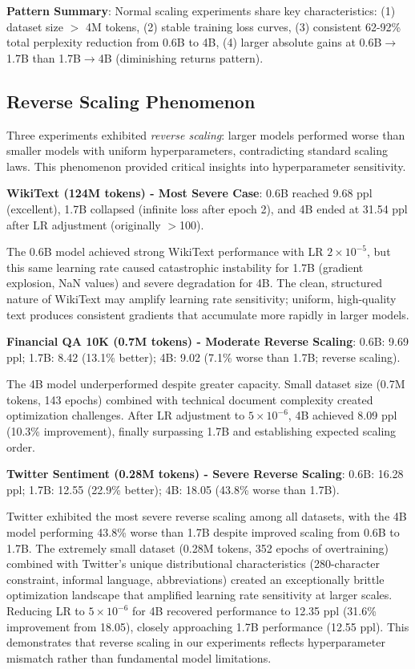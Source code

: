 \textbf{Pattern Summary}: Normal scaling experiments share key characteristics: (1) dataset size $>$ 4M tokens, (2) stable training loss curves, (3) consistent 62-92\% total perplexity reduction from 0.6B to 4B, (4) larger absolute gains at 0.6B$\to$1.7B than 1.7B$\to$4B (diminishing returns pattern).

\subsection{Reverse Scaling Phenomenon}

Three experiments exhibited \textit{reverse scaling}: larger models performed worse than smaller models with uniform hyperparameters, contradicting standard scaling laws. This phenomenon provided critical insights into hyperparameter sensitivity.

\textbf{WikiText (124M tokens) - Most Severe Case}: 0.6B reached 9.68 ppl (excellent), 1.7B collapsed (infinite loss after epoch 2), and 4B ended at 31.54 ppl after LR adjustment (originally $>$100).

The 0.6B model achieved strong WikiText performance with LR $2\times10^{-5}$, but this same learning rate caused catastrophic instability for 1.7B (gradient explosion, NaN values) and severe degradation for 4B. The clean, structured nature of WikiText may amplify learning rate sensitivity; uniform, high-quality text produces consistent gradients that accumulate more rapidly in larger models.

\textbf{Financial QA 10K (0.7M tokens) - Moderate Reverse Scaling}: 0.6B: 9.69 ppl; 1.7B: 8.42 (13.1\% better); 4B: 9.02 (7.1\% worse than 1.7B; reverse scaling).

The 4B model underperformed despite greater capacity. Small dataset size (0.7M tokens, 143 epochs) combined with technical document complexity created optimization challenges. After LR adjustment to $5\times10^{-6}$, 4B achieved 8.09 ppl (10.3\% improvement), finally surpassing 1.7B and establishing expected scaling order.

\textbf{Twitter Sentiment (0.28M tokens) - Severe Reverse Scaling}: 0.6B: 16.28 ppl; 1.7B: 12.55 (22.9\% better); 4B: 18.05 (43.8\% worse than 1.7B).

Twitter exhibited the most severe reverse scaling among all datasets, with the 4B model performing 43.8\% worse than 1.7B despite improved scaling from 0.6B to 1.7B. The extremely small dataset (0.28M tokens, 352 epochs of overtraining) combined with Twitter's unique distributional characteristics (280-character constraint, informal language, abbreviations) created an exceptionally brittle optimization landscape that amplified learning rate sensitivity at larger scales. Reducing LR to $5\times10^{-6}$ for 4B recovered performance to 12.35 ppl (31.6\% improvement from 18.05), closely approaching 1.7B performance (12.55 ppl). This demonstrates that reverse scaling in our experiments reflects hyperparameter mismatch rather than fundamental model limitations.

